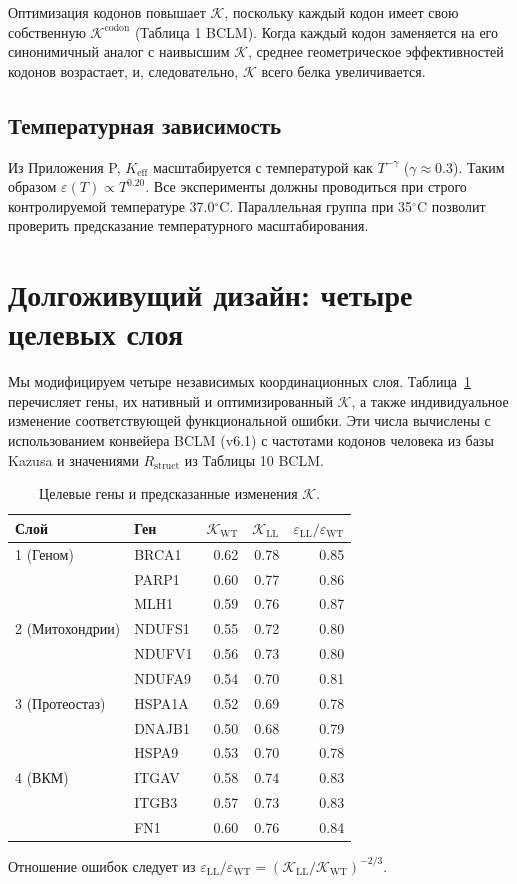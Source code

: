 \documentclass[12pt,a4paper]{article}
\newcommand{\REL}{\mathcal{K}}          %
\begin{document}
	Оптимизация кодонов повышает \(\REL\), поскольку каждый кодон имеет свою собственную \(\REL^{\mathrm{codon}}\) (Таблица 1 BCLM). Когда каждый кодон заменяется на его синонимичный аналог с наивысшим \(\REL\), среднее геометрическое эффективностей кодонов возрастает, и, следовательно, \(\REL\) всего белка увеличивается.
	
	\subsection{Температурная зависимость}
	Из Приложения P, \(K_{\mathrm{eff}}\) масштабируется с температурой как \(T^{-\gamma}\) (\(\gamma\approx0.3\)). Таким образом \(\varepsilon(T) \propto T^{0.20}\). Все эксперименты должны проводиться при строго контролируемой температуре 37.0\(^\circ\)C. Параллельная группа при 35\(^\circ\)C позволит проверить предсказание температурного масштабирования.
	
	\section{Долгоживущий дизайн: четыре целевых слоя}
	\label{sec:layers}
	Мы модифицируем четыре независимых координационных слоя. Таблица~\ref{tab:targets} перечисляет гены, их нативный и оптимизированный \(\REL\), а также индивидуальное изменение соответствующей функциональной ошибки. Эти числа вычислены с использованием конвейера BCLM (v6.1) с частотами кодонов человека из базы Kazusa и значениями \(R_{\mathrm{struct}}\) из Таблицы 10 BCLM.
	
	\begin{table}[H]
		\centering
		\caption{Целевые гены и предсказанные изменения \(\REL\).}
		\label{tab:targets}
		\begin{tabular}{@{}llrrr@{}}
			\toprule
			\textbf{Слой} & \textbf{Ген} & \(\REL_{\mathrm{WT}}\) & \(\REL_{\mathrm{LL}}\) & \(\varepsilon_{\mathrm{LL}}/\varepsilon_{\mathrm{WT}}\) \\
			\midrule
			1 (Геном) & BRCA1 & 0.62 & 0.78 & 0.85 \\
			& PARP1 & 0.60 & 0.77 & 0.86 \\
			& MLH1  & 0.59 & 0.76 & 0.87 \\
			2 (Митохондрии)   & NDUFS1 & 0.55 & 0.72 & 0.80 \\
			& NDUFV1 & 0.56 & 0.73 & 0.80 \\
			& NDUFA9 & 0.54 & 0.70 & 0.81 \\
			3 (Протеостаз) & HSPA1A & 0.52 & 0.69 & 0.78 \\
			& DNAJB1 & 0.50 & 0.68 & 0.79 \\
			& HSPA9  & 0.53 & 0.70 & 0.78 \\
			4 (ВКМ)    & ITGAV  & 0.58 & 0.74 & 0.83 \\
			& ITGB3  & 0.57 & 0.73 & 0.83 \\
			& FN1    & 0.60 & 0.76 & 0.84 \\
			\bottomrule
		\end{tabular}
		\footnotesize Отношение ошибок следует из \(\varepsilon_{\mathrm{LL}}/\varepsilon_{\mathrm{WT}} = (\REL_{\mathrm{LL}}/\REL_{\mathrm{WT}})^{-2/3}\).
	\end{table}
	
\end{document}
